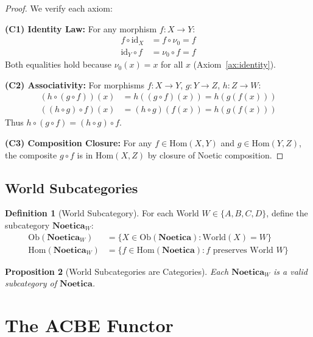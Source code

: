\documentclass[11pt,twoside,openright]{book}
\theoremstyle{definition}
\newtheorem{definition}{Definition}[chapter]
\theoremstyle{plain}
\newtheorem{proposition}[definition]{Proposition}
\theoremstyle{remark}
\newcommand{\Noetica}{\mathbf{Noetica}}
\newcommand{\noe}[1]{\nu_{#1}}
\newcommand{\Ob}{\mathrm{Ob}}
\newcommand{\Hom}{\mathrm{Hom}}
\newcommand{\id}{\mathrm{id}}
\begin{document}
\begin{proof}
We verify each axiom:

\textbf{(C1) Identity Law:}
For any morphism $f : X \to Y$:
\begin{align}
f \circ \id_X &= f \circ \noe{0} = f \\
\id_Y \circ f &= \noe{0} \circ f = f
\end{align}
Both equalities hold because $\noe{0}(x) = x$ for all $x$ (Axiom~\ref{ax:identity}).

\textbf{(C2) Associativity:}
For morphisms $f : X \to Y$, $g : Y \to Z$, $h : Z \to W$:
\begin{align}
(h \circ (g \circ f))(x) &= h((g \circ f)(x)) = h(g(f(x))) \\
((h \circ g) \circ f)(x) &= (h \circ g)(f(x)) = h(g(f(x)))
\end{align}
Thus $h \circ (g \circ f) = (h \circ g) \circ f$.

\textbf{(C3) Composition Closure:}
For any $f \in \Hom(X, Y)$ and $g \in \Hom(Y, Z)$, the composite $g \circ f$ is in $\Hom(X, Z)$ by closure of Noetic composition.
\end{proof}

\section{World Subcategories}

\begin{definition}[World Subcategory]
\label{def:world-subcat}
For each World $W \in \{A, B, C, D\}$, define the subcategory $\Noetica_W$:
\begin{align}
\Ob(\Noetica_W) &= \{X \in \Ob(\Noetica) : \mathrm{World}(X) = W\} \\
\Hom(\Noetica_W) &= \{f \in \Hom(\Noetica) : f \text{ preserves World } W\}
\end{align}
\end{definition}

\begin{proposition}[World Subcategories are Categories]
\label{prop:world-subcat}
Each $\Noetica_W$ is a valid subcategory of $\Noetica$.
\end{proposition}

\chapter{The ACBE Functor}
\label{ch:acbe-functor}
\end{document}
